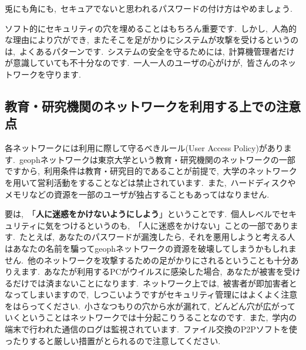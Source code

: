 \documentclass{jarticle}
\begin{document}
兎にも角にも,\ セキュアでないと思われるパスワードの付け方はやめましょう.\ 

ソフト的にセキュリティの穴を埋めることはもちろん重要です.\ 
しかし,\ 人為的な理由により穴ができ,\ またそこを足がかりにシステムが攻撃を受けるというのは,\ よくあるパターンです.\ 
システムの安全を守るためには,\ 計算機管理者だけが意識していても不十分なのです.\ 
一人一人のユーザの心がけが,\ 皆さんのネットワークを守ります.\ 

\subsection{教育・研究機関のネットワークを利用する上での注意点}
各ネットワークには利用に際して守るべきルール(User Access Policy)があります.\ 
geophネットワークは東京大学という教育・研究機関のネットワークの一部ですから,\ 
利用条件は教育・研究目的であることが前提で,\ 大学のネットワークを用いて営利活動をすることなどは禁止されています.\ 
また,\ ハードディスクやメモリなどの資源を一部のユーザが独占することもあってはなりません.\ 
 
要は,\ 「{\bf 人に迷惑をかけないようにしよう}」ということです.\ 
個人レベルでセキュリティに気をつけるというのも,\ 「人に迷惑をかけない」ことの一部であります.\ 
たとえば,\ あなたのパスワードが漏洩したら,\ 
それを悪用しようと考える人はあなたの名前を騙ってgeophネットワークの資源を破壊してしまうかもしれません.\ 
他のネットワークを攻撃するための足がかりにされるということも十分ありえます.\ 
あなたが利用するPCがウイルスに感染した場合,\ あなたが被害を受けるだけでは済まないことになります.\ 
ネットワーク上では,\ 被害者が即加害者となってしまいますので,\ しつこいようですがセキュリティ管理にはよくよく注意をはらってください.\ 
小さなつもりの穴から水が漏れて,\ どんどん穴が広がっていくということはネットワークでは十分起こりうることなのです.\ 
また,\ 学内の端末で行われた通信のログは監視されています.\ 
ファイル交換のP2Pソフトを使ったりすると厳しい措置がとられるので注意してください.\ 

\newpage
\end{document}

